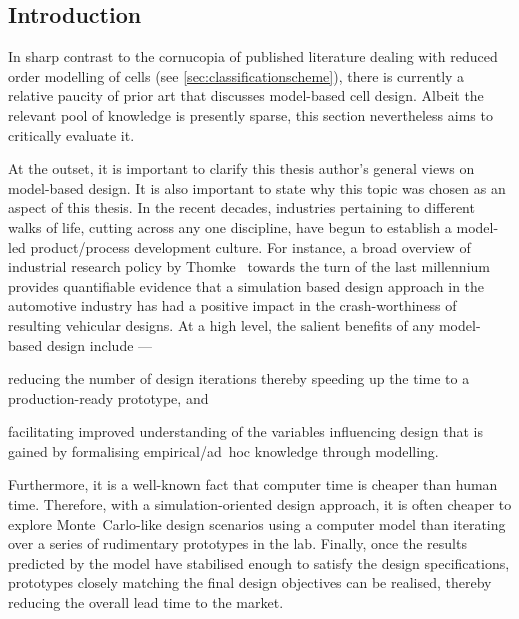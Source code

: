 


\subsection{Introduction}

In  sharp  contrast to  the  cornucopia  of  published literature  dealing  with
reduced order modelling of cells (see \cref{sec:classificationscheme}), there is
currently  a relative  paucity  of  prior art  that  discusses model-based  cell
design. Albeit the relevant pool of  knowledge is presently sparse, this section
nevertheless aims to critically evaluate it.

At the outset, it is important to  clarify this thesis author's general views on
model-based design. It is  also important to state why this  topic was chosen as
an  aspect of  this  thesis. In  the recent  decades,  industries pertaining  to
different  walks of  life,  cutting across  any one  discipline,  have begun  to
establish a model-led product/process development culture. For instance, a broad
overview of  industrial research policy by  Thomke~\cite{Thomke1998} towards the
turn of  the last  millennium provides quantifiable  evidence that  a simulation
based design  approach in the automotive  industry has had a  positive impact in
the  crash-worthiness of  resulting  vehicular  designs. At  a  high level,  the
salient benefits of any model-based design include ---
\begin{enumerate*}[label=\itshape\alph*\upshape)]
    \item reducing the number of design iterations thereby speeding up the time to a production-ready prototype, and
    \item facilitating improved understanding of the variables influencing design that is gained by formalising empirical/\mbox{ad hoc} knowledge through modelling.
\end{enumerate*}
Furthermore, it  is a well-known fact  that computer time is cheaper  than human
time. Therefore, with a simulation-oriented design approach, it is often cheaper
to  explore  Monte~Carlo-like  design  scenarios using  a  computer  model  than
iterating over a series of rudimentary  prototypes in the lab. Finally, once the
results predicted  by the  model have  stabilised enough  to satisfy  the design
specifications, prototypes closely  matching the final design  objectives can be
realised, thereby reducing the overall lead time to the market.

